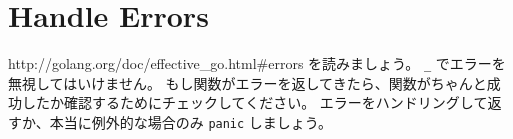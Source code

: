 \section{Handle Errors}

http:\//\//golang.org\//doc\//effective\_go.html\#errors を読みましょう。 \texttt{\_} でエラーを無視してはいけません。 もし関数がエラーを返してきたら、関数がちゃんと成功したか確認するためにチェックしてください。 エラーをハンドリングして返すか、本当に例外的な場合のみ \texttt{panic} しましょう。
